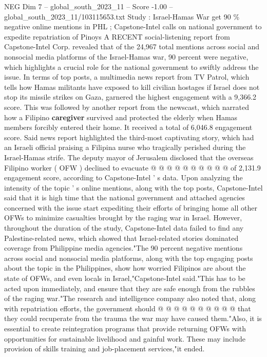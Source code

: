 \begin{textsample}{NEG Dim 7 – global\_south\_2023\_11 – Score -1.00 – global\_south\_2023\_11/103115653.txt}  \label{ex:f7_neg_151}
Study : Israel-Hamas War get 90 \% negative online mentions in PHL ; Capstone-Intel calls on national government to expedite repatriation of Pinoys A RECENT social-listening report from Capstone-Intel Corp. revealed that of the 24,967 total mentions across social and nonsocial media platforms of the Israel-Hamas war, 90 percent were negative, which highlights a crucial role for the national government to swiftly address the issue.
In terms of top posts, a multimedia news report from TV Patrol, which tells how Hamas militants have exposed to kill civilian hostages if Israel does not stop its missile strikes on Gaza, garnered the highest engagement with a 9,366.2 score.
This was followed by another report from the newscast, which narrated how a Filipino \textbf{caregiver} survived and protected the elderly when Hamas members forcibly entered their home.
It received a total of 6,046.8 engagement score.
Said news report highlighted the third-most captivating story, which had an Israeli official praising a Filipina nurse who tragically perished during the Israel-Hamas strife.
The deputy mayor of Jerusalem disclosed that the overseas Filipino worker ( OFW ) declined to evacuate @ @ @ @ @ @ @ @ @ @ of 2,131.9 engagement score, according to Capstone-Intel ' s data.
Upon analyzing the intensity of the topic ' s online mentions, along with the top posts, Capstone-Intel said that it is high time that the national government and attached agencies concerned with the issue start expediting their efforts of bringing home all other OFWs to minimize casualties brought by the raging war in Israel.
However, throughout the duration of the study, Capstone-Intel data failed to find any Palestine-related news, which showed that Israel-related stories dominated coverage from Philippine media agencies."The 90 percent negative mentions across social and nonsocial media platforms, along with the top engaging posts about the topic in the Philippines, show how worried Filipinos are about the state of OFWs, and even locals in Israel,"Capstone-Intel said."This has to be acted upon immediately, and ensure that they are safe enough from the rubbles of the raging war."The research and intelligence company also noted that, along with repatriation efforts, the government should @ @ @ @ @ @ @ @ @ @ that they could recuperate from the trauma the war may have caused them."Also, it is essential to create reintegration programs that provide returning OFWs with opportunities for sustainable livelihood and gainful work.
These may include provision of skills training and job-placement services,"it ended.

\end{textsample}
